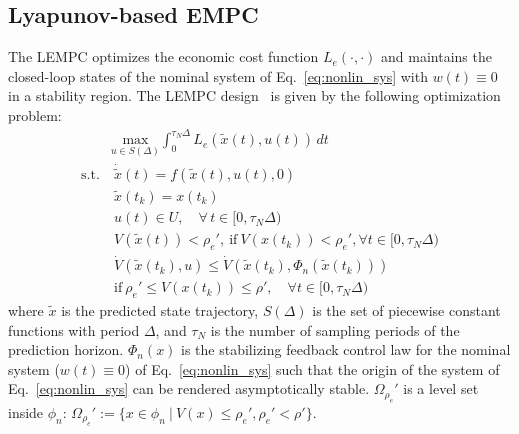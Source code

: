 \documentclass[letterpaper, 10pt, conference]{ieeeconf}
\begin{document}
	\subsection{Lyapunov-based EMPC}
	The LEMPC optimizes the economic cost function $L_e(\cdot,\cdot)$ and maintains the closed-loop states of the nominal system of Eq.~\ref{eq:nonlin_sys} with $w(t) \equiv 0$ in a stability region. The LEMPC design~\cite{Heidarinejad2012855} is given by the following optimization problem:
	 \begin{subequations}
		\label{eq:nLEMPC}
		\begin{align}
		&\underset{u \in S(\Delta)}{\text{max}}  \int_{0}^{\tau_{N} \Delta} L_e( \tilde{x}(t), u(t)) \, dt \label{eq:nLEMPC:cost} \\
		\text{s.t.} & ~\dot{\tilde{x}}(t) = f(\tilde{x}(t), u(t),0) \label{eq:nLEMPC:model} \\
		& ~ \tilde{x}(t_k) = x(t_k) \label{eq:nLEMPC:state} \\
		&~u(t) \in U, \quad \forall \, t \in [0, \tau_{N} \Delta) \label{eq:nLEMPC:input} \\
		&~ V(\tilde{x}(t)) < \rho_e',~ \mbox{if}~V(x(t_k)) < \rho_e', \forall t \in [0, \tau_{N} \Delta)  \label{eq:nLEMPC:mode1}\\
		&~\dot{V}(\tilde{x}(t_k),u) \leq \dot{V}(\tilde{x}(t_k),\Phi_n(\tilde{x}(t_k)))\nonumber\\
		&	~ \mbox{if}~ \rho_e' \leq V(x(t_k)) \leq  \rho', \quad \forall t \in [0, \tau_{N} \Delta)\label{eq:nLEMPC:mode2}
		\end{align}
	\end{subequations}
where $\tilde{x}$ is the predicted state trajectory, $S(\Delta)$ is the set of piecewise constant functions with period $\Delta$, and $\tau_{N}$ is the number of sampling periods of the prediction horizon. $\Phi_n(x)$ is the stabilizing feedback control law for the nominal system ($w(t) \equiv 0$) of Eq.~\ref{eq:nonlin_sys} such that the origin of the system of Eq.~\ref{eq:nonlin_sys} can be rendered asymptotically stable. $\Omega_{\rho_e}'$ is a level set inside $\phi_{n}$: $\Omega_{\rho_e}' :=\{ x \in \phi_n ~|~ V(x) \leq \rho_e', \rho_e' <\rho'\}$.
\end{document}
